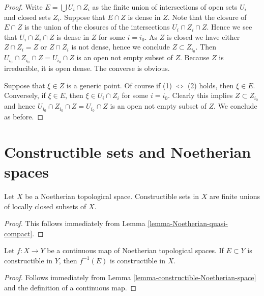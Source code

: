 \begin{proof}
Write $E = \bigcup U_i \cap Z_i$ as the finite union of
intersections of open sets $U_i$ and closed sets $Z_i$.
Suppose that $E \cap Z$ is dense in $Z$. Note that
the closure of $E \cap Z$ is the union of the closures
of the intersections $U_i \cap Z_i \cap Z$. Hence we
see that $U_i \cap Z_i \cap Z$ is dense in $Z$ for some $i = i_0$.
As $Z$ is closed we have either $Z \cap Z_i = Z$ or
$Z \cap Z_i$ is not dense, hence we conclude $Z \subset Z_{i_0}$.
Then $U_{i_0} \cap Z_{i_0} \cap Z = U_{i_0} \cap Z$ is an open
not empty subset of $Z$. Because $Z$ is irreducible, it is open dense.
The converse is obvious.

\medskip\noindent
Suppose that $\xi \in Z$ is a generic point. Of course if
(1) $\Leftrightarrow$ (2) holds, then $\xi \in E$. Conversely,
if $\xi \in E$, then $\xi \in U_i \cap Z_i$ for some $i = i_0$.
Clearly this implies $Z \subset Z_{i_0}$ and hence
$U_{i_0} \cap Z_{i_0} \cap Z = U_{i_0} \cap Z$ is an open
not empty subset of $Z$. We conclude as before.
\end{proof}







\section{Constructible sets and Noetherian spaces}
\label{section-constructible-Noetherian}

\begin{lemma}
\label{lemma-constructible-Noetherian-space}
Let $X$ be a Noetherian topological space.
Constructible sets in $X$ are finite unions
of locally closed subsets of $X$.
\end{lemma}

\begin{proof}
This follows immediately from
Lemma \ref{lemma-Noetherian-quasi-compact}.
\end{proof}

\begin{lemma}
\label{lemma-constructible-map-Noetherian}
Let $f : X \to Y$ be a continuous map of Noetherian topological spaces.
If $E \subset Y$ is constructible in $Y$, then $f^{-1}(E)$ is constructible
in $X$.
\end{lemma}

\begin{proof}
Follows immediately from
Lemma \ref{lemma-constructible-Noetherian-space}
and the definition of a continuous map.
\end{proof}

